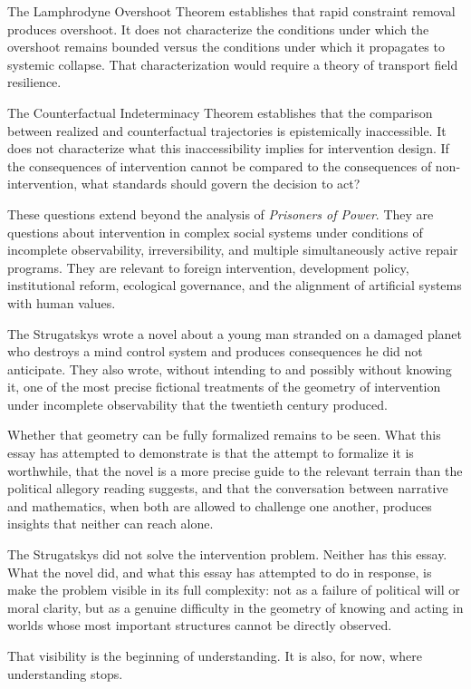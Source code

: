 \documentclass[12pt, a4paper]{article}
\theoremstyle{plain}
\theoremstyle{definition}
\theoremstyle{remark}
\begin{document}
The Lamphrodyne Overshoot Theorem establishes
that rapid constraint removal produces overshoot.
It does not characterize the conditions under
which the overshoot remains bounded versus the
conditions under which it propagates to systemic
collapse. That characterization would require a
theory of transport field resilience.

The Counterfactual Indeterminacy Theorem
establishes that the comparison between realized
and counterfactual trajectories is epistemically
inaccessible. It does not characterize what this
inaccessibility implies for intervention design.
If the consequences of intervention cannot be
compared to the consequences of non-intervention,
what standards should govern the decision to act?

These questions extend beyond the analysis of
\textit{Prisoners of Power}. They are questions
about intervention in complex social systems under
conditions of incomplete observability,
irreversibility, and multiple simultaneously active
repair programs. They are relevant to foreign
intervention, development policy, institutional
reform, ecological governance, and the alignment
of artificial systems with human values.

The Strugatskys wrote a novel about a young man
stranded on a damaged planet who destroys a mind
control system and produces consequences he did
not anticipate. They also wrote, without intending
to and possibly without knowing it, one of the
most precise fictional treatments of the geometry
of intervention under incomplete observability
that the twentieth century produced.

Whether that geometry can be fully formalized
remains to be seen. What this essay has attempted
to demonstrate is that the attempt to formalize
it is worthwhile, that the novel is a more precise
guide to the relevant terrain than the political
allegory reading suggests, and that the
conversation between narrative and mathematics,
when both are allowed to challenge one another,
produces insights that neither can reach alone.

The Strugatskys did not solve the intervention
problem. Neither has this essay. What the novel
did, and what this essay has attempted to do in
response, is make the problem visible in its full
complexity: not as a failure of political will or
moral clarity, but as a genuine difficulty in the
geometry of knowing and acting in worlds whose
most important structures cannot be directly
observed.

That visibility is the beginning of understanding.
It is also, for now, where understanding stops.
\end{document}
